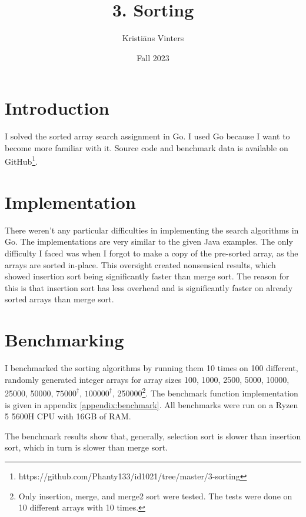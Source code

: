 \documentclass[a4paper,11pt]{article}
\title{\textbf{3. Sorting}}
\author{Kristiāns Vinters}
\date{Fall 2023}
\begin{document}
    \maketitle
    \section*{Introduction}

    I solved the sorted array search assignment in Go. I used Go because I want to become more familiar with it. Source code and benchmark data is available on GitHub\footnote[1]{https://github.com/Phanty133/id1021/tree/master/3-sorting}.

    \section*{Implementation}

    There weren't any particular difficulties in implementing the search algorithms in Go. The implementations are very similar to the given Java examples. The only difficulty I faced was when I forgot to make a copy of the pre-sorted array, as the arrays are sorted in-place. This oversight created nonsensical results, which showed insertion sort being significantly faster than merge sort. The reason for this is that insertion sort has less overhead and is significantly faster on already sorted arrays than merge sort.

    \section*{Benchmarking}

    I benchmarked the sorting algorithms by running them 10 times on 100 different, randomly generated integer arrays for array sizes 100, 1000, 2500, 5000, 10000, 25000, 50000, $75000^\dagger$, $100000^\dagger$, 250000\footnote[2]{Only insertion, merge, and merge2 sort were tested. The tests were done on 10 different arrays with 10 times.}.
    The benchmark function implementation is given in appendix \ref{appendix:benchmark}. All benchmarks were run on a Ryzen 5 5600H CPU with 16GB of RAM.

    The benchmark results show that, generally, selection sort is slower than insertion sort, which in turn is slower than merge sort.
\end{document}
